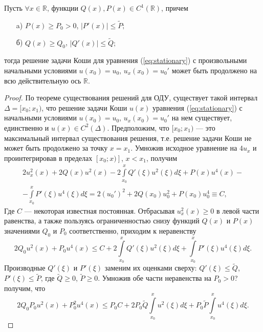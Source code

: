 \begin{proposition}
Пусть $\forall x \in \mathbb{R}$, функции $Q(x), P(x) \in C^1(\mathbb{R})$, причем
%
\begin{itemize}
\item[a)] $P(x) \ge P_0 > 0$, $|P'(x)| \le \widetilde{P};$
\item[б)] $Q(x) \ge Q_0$, $|Q'(x)| \le \widetilde{Q};$
\end{itemize}
%
тогда решение задачи Коши для уравнения (\ref{eq:stationary}) с произвольными начальными условиями $u(x_0) = u_0$, $u_x(x_0) = u_0'$ может быть продолжено на всю действительную ось $\mathbb{R}$.
\label{prop:continuation}
\end{proposition}
%
\begin{proof}
По теореме существования решений для ОДУ, существует такой интервал $\Delta = [x_0; x_1)$, что решение задачи Коши $u(x)$ уравнения (\ref{eq:stationary}) с начальными условиями $u(x_0) = u_0$, $u_x(x_0) = u_0'$ на нем существует, единственно и $u(x) \in C^2(\Delta)$.
Предположим, что $[x_0; x_1)$ --- это максимальный интервал существования решения, т.е. решение задачи Коши не может быть продолжено за точку $x = x_1$.
Умножив исходное уравнение на $4u_x$ и проинтегрировав в пределах $[x_0; x)]$, $x < x_1$, получим
%
\begin{eqnarray}
2u_{x}^2(x) + 2Q(x)u^2(x) - 2{\int \limits_{x_0}^x Q'(\xi)u^2(\xi)d\xi} + P(x)u^4(x) - \\
\nonumber - {\int \limits_{x_0}^x P'(\xi)u^4(\xi)d\xi} = 2(u_0')^2 + 2Q(x_0)u_0^2 + P(x_0)u_0^4 \equiv C,\label{eq:integrated}
\end{eqnarray}
%
Где $C$ --- некоторая известная постоянная.
Отбрасывая $u_x^2(x) \ge 0$ в левой части равенства, а также пользуясь ограниченностью снизу функций $Q(x)$ и $P(x)$ значениями $Q_0$ и $P_0$ соответственно, приходим к неравенству
%
\begin{equation}
2Q_0 u^2(x) + P_0 u^4(x) \le C + 2{\int \limits_{x_0}^x
Q'(\xi)u^2(\xi)d\xi} + {\int \limits_{x_0}^x P'(\xi)u^4(\xi)d\xi}.
\label{eq:bound}
\end{equation}
%
Производные $Q'(\xi)$ и $P'(\xi)$ заменим их оценками сверху: $Q'(\xi) \le \widetilde{Q}$, $P'(\xi) \le \widetilde{P}$, где $\widetilde{Q} \ge 0$, $\widetilde{P} \ge 0$.
Умножив обе части неравенства на $P_0 > 0$? получим, что
%
\begin{equation}
2Q_0 P_0 u^2(x) + P_0^2 u^4(x) \le P_0 C + 2P_0 \widetilde{Q}{\int\limits_{x_0}^x u^2(\xi)d\xi} + P_0 \widetilde{P}{\int \limits_{x_0}^x u^4(\xi)d\xi}.
\end{equation}

\end{proof}
